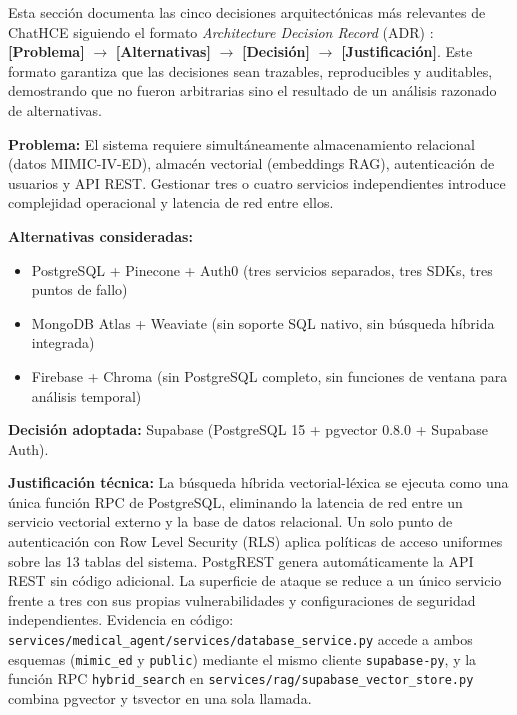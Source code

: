Esta sección documenta las cinco decisiones arquitectónicas más relevantes de ChatHCE siguiendo el formato \textit{Architecture Decision Record} (ADR) \citep{Nygard2011}: \textbf{[Problema]} $\rightarrow$ \textbf{[Alternativas]} $\rightarrow$ \textbf{[Decisión]} $\rightarrow$ \textbf{[Justificación]}. Este formato garantiza que las decisiones sean trazables, reproducibles y auditables, demostrando que no fueron arbitrarias sino el resultado de un análisis razonado de alternativas.

\begin{tcolorbox}[
  enhanced, breakable,
  colback=blue!4, colframe=blue!45,
  title={\footnotesize\sffamily\bfseries Decisión 1 — Supabase como backend unificado (vs.\ servicios separados)},
  fonttitle=\color{white},
  attach boxed title to top left={yshift=-2mm, xshift=4mm},
  boxed title style={colback=blue!55, rounded corners},
  left=4pt, right=4pt, top=4pt, bottom=4pt
]
\footnotesize
\textbf{Problema:} El sistema requiere simultáneamente almacenamiento relacional (datos MIMIC-IV-ED), almacén vectorial (embeddings RAG), autenticación de usuarios y API REST. Gestionar tres o cuatro servicios independientes introduce complejidad operacional y latencia de red entre ellos.

\textbf{Alternativas consideradas:}
\begin{itemize}[nosep, leftmargin=*]
  \item PostgreSQL + Pinecone + Auth0 (tres servicios separados, tres SDKs, tres puntos de fallo)
  \item MongoDB Atlas + Weaviate (sin soporte SQL nativo, sin búsqueda híbrida integrada)
  \item Firebase + Chroma (sin PostgreSQL completo, sin funciones de ventana para análisis temporal)
\end{itemize}

\textbf{Decisión adoptada:} Supabase (PostgreSQL 15 + pgvector 0.8.0 + Supabase Auth).

\textbf{Justificación técnica:} La búsqueda híbrida vectorial-léxica se ejecuta como una única función RPC de PostgreSQL, eliminando la latencia de red entre un servicio vectorial externo y la base de datos relacional. Un solo punto de autenticación con Row Level Security (RLS) aplica políticas de acceso uniformes sobre las 13 tablas del sistema. PostgREST genera automáticamente la API REST sin código adicional. La superficie de ataque se reduce a un único servicio frente a tres con sus propias vulnerabilidades y configuraciones de seguridad independientes. Evidencia en código: \texttt{services/medical\_agent/services/database\_service.py} accede a ambos esquemas (\texttt{mimic\_ed} y \texttt{public}) mediante el mismo cliente \texttt{supabase-py}, y la función RPC \texttt{hybrid\_search} en \texttt{services/rag/supabase\_vector\_store.py} combina pgvector y tsvector en una sola llamada.
\end{tcolorbox}

